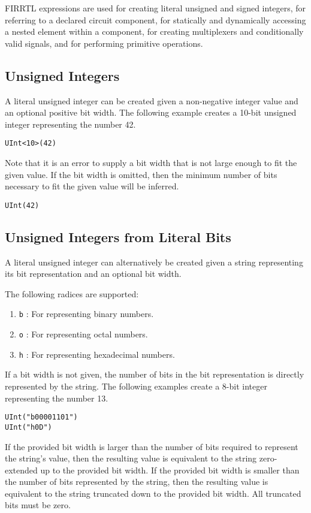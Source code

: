 \documentclass[12pt]{article}
\begin{document}
FIRRTL expressions are used for creating literal unsigned and signed integers, for referring to a declared circuit component, for statically and dynamically accessing a nested element within a component, for creating multiplexers and conditionally valid signals, and for performing primitive operations.

\subsection{Unsigned Integers}

A literal unsigned integer can be created given a non-negative integer value and an optional positive bit width. The following example creates a 10-bit unsigned integer representing the number 42.
\begin{lstlisting}
UInt<10>(42)
\end{lstlisting}

Note that it is an error to supply a bit width that is not large enough to fit the given value. If the bit width is omitted, then the minimum number of bits necessary to fit the given value will be inferred.
\begin{lstlisting}
UInt(42)
\end{lstlisting}

\subsection{Unsigned Integers from Literal Bits}

A literal unsigned integer can alternatively be created given a string representing its bit representation and an optional bit width.

The following radices are supported:
\begin{enumerate}
\item \verb|b| : For representing binary numbers.
\item \verb|o| : For representing octal numbers.
\item \verb|h| : For representing hexadecimal numbers.
\end{enumerate}

If a bit width is not given, the number of bits in the bit representation is directly represented by the string. The following examples create a 8-bit integer representing the number 13.
\begin{lstlisting}
UInt("b00001101")
UInt("h0D")
\end{lstlisting}

If the provided bit width is larger than the number of bits required to represent the string's value, then the resulting value is equivalent to the string zero-extended up to the provided bit width. If the provided bit width is smaller than the number of bits represented by the string, then the resulting value is equivalent to the string truncated down to the provided bit width. All truncated bits must be zero.
\end{document}
